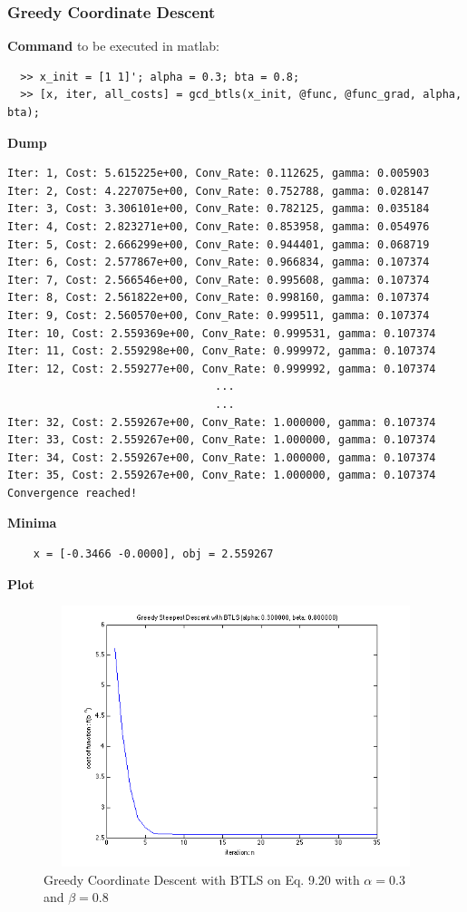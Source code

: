 \documentclass[11pt,a4paper]{article}
\begin{document}
\subsubsection{Greedy Coordinate Descent}
{\bf Command} to be executed in matlab:
\begin{verbatim}
  >> x_init = [1 1]'; alpha = 0.3; bta = 0.8;
  >> [x, iter, all_costs] = gcd_btls(x_init, @func, @func_grad, alpha, bta);
\end{verbatim}
{\bf Dump}
\begin{verbatim}
Iter: 1, Cost: 5.615225e+00, Conv_Rate: 0.112625, gamma: 0.005903
Iter: 2, Cost: 4.227075e+00, Conv_Rate: 0.752788, gamma: 0.028147
Iter: 3, Cost: 3.306101e+00, Conv_Rate: 0.782125, gamma: 0.035184
Iter: 4, Cost: 2.823271e+00, Conv_Rate: 0.853958, gamma: 0.054976
Iter: 5, Cost: 2.666299e+00, Conv_Rate: 0.944401, gamma: 0.068719
Iter: 6, Cost: 2.577867e+00, Conv_Rate: 0.966834, gamma: 0.107374
Iter: 7, Cost: 2.566546e+00, Conv_Rate: 0.995608, gamma: 0.107374
Iter: 8, Cost: 2.561822e+00, Conv_Rate: 0.998160, gamma: 0.107374
Iter: 9, Cost: 2.560570e+00, Conv_Rate: 0.999511, gamma: 0.107374
Iter: 10, Cost: 2.559369e+00, Conv_Rate: 0.999531, gamma: 0.107374
Iter: 11, Cost: 2.559298e+00, Conv_Rate: 0.999972, gamma: 0.107374
Iter: 12, Cost: 2.559277e+00, Conv_Rate: 0.999992, gamma: 0.107374
                                ...
                                ...
Iter: 32, Cost: 2.559267e+00, Conv_Rate: 1.000000, gamma: 0.107374
Iter: 33, Cost: 2.559267e+00, Conv_Rate: 1.000000, gamma: 0.107374
Iter: 34, Cost: 2.559267e+00, Conv_Rate: 1.000000, gamma: 0.107374
Iter: 35, Cost: 2.559267e+00, Conv_Rate: 1.000000, gamma: 0.107374
Convergence reached!
\end{verbatim}
{\bf Minima}
\begin{verbatim}
    x = [-0.3466 -0.0000], obj = 2.559267 
   \end{verbatim}
{\bf Plot}
\begin{figure}[h]
    \centering
    \includegraphics[width=5in,height=3in]{../ps2_matlab/5.png}
    \caption{Greedy Coordinate Descent with BTLS on
        Eq. 9.20 with $\alpha = 0.3$ and $\beta = 0.8$}
\end{figure}
\end{document}
